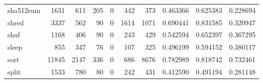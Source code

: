 \begin{longtable}{lrrrrrrrrr}
sha512sum &                                1631 &                                             611 &                                            205 &                                             0 &                                            442 &                                          373 &                                           0.463366 &                               0.625383 &                             0.228694 \\
shred     &                                3337 &                                             562 &                                             90 &                                             0 &                                           1614 &                                         1071 &                                           0.690441 &                               0.831585 &                             0.320947 \\
shuf      &                                1168 &                                             406 &                                             90 &                                             0 &                                            243 &                                          429 &                                           0.542594 &                               0.652397 &                             0.367295 \\
sleep     &                                 855 &                                             347 &                                             76 &                                             0 &                                            107 &                                          325 &                                           0.496199 &                               0.594152 &                             0.380117 \\
sort      &                               11845 &                                            2147 &                                            336 &                                             0 &                                            686 &                                         8676 &                                           0.782989 &                               0.818742 &                             0.732461 \\
split     &                                1533 &                                             780 &                                             80 &                                             0 &                                            242 &                                          431 &                                           0.412590 &                               0.491194 &                             0.281148 \\

\end{longtable}
